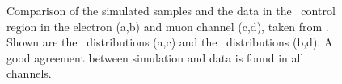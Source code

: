 \begin{figure}
	\centering
	\caption[Comparison of the simulated samples and the data in the \ttbar \ control region]{Comparison of the simulated samples and the data in the \ttbar \ control region in the electron (a,b) and muon channel (c,d), taken from \cite{PAS}. Shown are the \Mpr \ distributions (a,c) and the \MWV \ distributions (b,d). A good agreement between simulation and data is found in all channels.}
	\label{fig:reco:control}
\end{figure}
